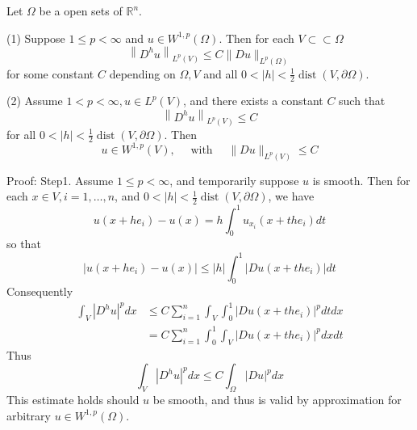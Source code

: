 \begin{theorem}
    Let $\Omega$ be a open sets of $\mathbb{R}^n$.

    (1) Suppose $1 \leq p<\infty$ and $u \in W^{1, p}\left(\Omega\right)$. Then for each $V \subset \subset \Omega$
    \begin{equation*}
        \left\|D^h u\right\|_{L^p(V)}
        \leq C\|D u\|_{L^p\left(\Omega\right)}
    \end{equation*}
    for some constant $C$ depending on $\Omega,V$ and all $0<|h|<\frac{1}{2} \operatorname{dist}(V, \partial \Omega)$.

    (2) Assume $1<p<\infty, u \in L^p(V)$, and there exists a constant $C$ such that
    \begin{equation*}
        \left\|D^h u\right\|_{L^p(V)} \leq C
    \end{equation*}
    for all $0<|h|<\frac{1}{2} \operatorname{dist}(V, \partial \Omega)$. Then
    \begin{equation*}
        u \in W^{1, p}(V), \quad \text { with } \quad\|D u\|_{L^p(V)} \leq C
    \end{equation*}

    Proof:
    Step1.
    Assume $1 \leq p<\infty$, and temporarily suppose $u$ is smooth. Then for each $x \in V, i=1, \ldots, n$, and $0<|h|<\frac{1}{2} \operatorname{dist}(V, \partial \Omega)$, we have
    \begin{equation*}
        u\left(x+h e_i\right)-u(x)=h \int_0^1 u_{x_i}\left(x+t h e_i\right) d t
    \end{equation*}
    so that
    \begin{equation*}
        \left|u\left(x+h e_i\right)-u(x)\right| \leq|h| \int_0^1\left|D u\left(x+t h e_i\right)\right| d t
    \end{equation*}
    Consequently
    \begin{equation*}
        \begin{aligned}
            \int_V\left|D^h u\right|^p d x & \leq C \sum_{i=1}^n \int_V \int_0^1\left|D u\left(x+t h e_i\right)\right|^p d t d x \\
                                           & =C \sum_{i=1}^n \int_0^1 \int_V\left|D u\left(x+t h e_i\right)\right|^p d x d t
        \end{aligned}
    \end{equation*}
    Thus
    \begin{equation*}
        \int_V\left|D^h u\right|^p d x \leq C \int_\Omega|D u|^p d x
    \end{equation*}
    This estimate holds should $u$ be smooth, and thus is valid by approximation for arbitrary $u \in W^{1, p}\left(\Omega\right)$.


\end{theorem}
